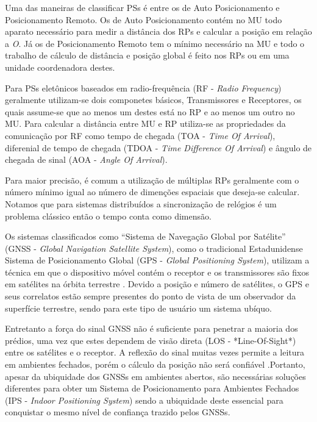 \documentclass[
	12pt,				%
	openright,			%
	oneside,			%
	a4paper,			%
	chapter=TITLE,		%
	english,			%
	french,				%
	spanish,			%
	brazil				%
	]{abntex2}
\begin{document}
{Uma das maneiras de classificar PSs é entre os de Auto Posicionamento e
Posicionamento Remoto. Os de Auto Posicionamento contém no MU todo aparato
necessário para medir a distância dos RPs e calcular a posição em relação a \textit{O}.
Já os de Posicionamento Remoto tem o mínimo necessário na MU e todo o trabalho
de cálculo de distância e posição global é feito nos RPs ou em uma unidade
coordenadora destes.

Para PSs eletônicos baseados em radio-frequência (RF - \textit{Radio Frequency})
geralmente utilizam-se dois componetes básicos, Transmissores e Receptores, os
quais assume-se que ao menos um destes está no RP e ao menos um outro no MU.
Para calcular a distância entre MU e RP utiliza-se as propriedades da
comunicação por RF como tempo de chegada (TOA - \textit{Time Of Arrival}), diferenial
de tempo de chegada (TDOA - \textit{Time Difference Of Arrival}) e ângulo de chegada de
sinal (AOA - \textit{Angle Of Arrival}).

Para maior precisão, é comum a utilização de múltiplas RPs geralmente com o
número mínimo igual ao número de dimenções espaciais que deseja-se calcular.
Notamos que para sistemas distribuídos a sincronização de relógios é um
problema clássico então o tempo conta como dimensão.

Os sistemas classificados como ``Sistema de Navegação Global por Satélite'' (GNSS -
\textit{Global Navigation Satellite System}), como o tradicional Estadunidense Sistema
de Posicionamento Global (GPS - \textit{Global Positioning System}), utilizam a técnica
em que o dispositivo móvel contém o receptor e os transmissores são fixos em
satélites na órbita terrestre \cite{Djuknic2001}. Devido a posição e número de
satélites, o GPS e seus correlatos estão sempre presentes do ponto de vista de
um observador da superfície terrestre, sendo para este tipo de usuário um
sistema ubíquo.

Entretanto a força do sinal GNSS não é suficiente para penetrar a maioria dos
prédios, uma vez que estes dependem de visão direta (LOS - *Line-Of-Sight*)
entre os satélites e o receptor. A reflexão do sinal muitas vezes permite a
leitura em ambientes fechados, porém o cálculo da posição não será confiável
\cite{Dartmouth2000}.Portanto, apesar da ubiquidade dos GNSSs em ambientes abertos,
são necessárias soluções diferentes para obter um Sistema de Posicionamento para
Ambientes Fechados (IPS - \textit{Indoor Positioning System}) sendo a ubiquidade deste
essencial para conquistar o mesmo nível de confiança trazido pelos GNSSs.

}
\end{document}

